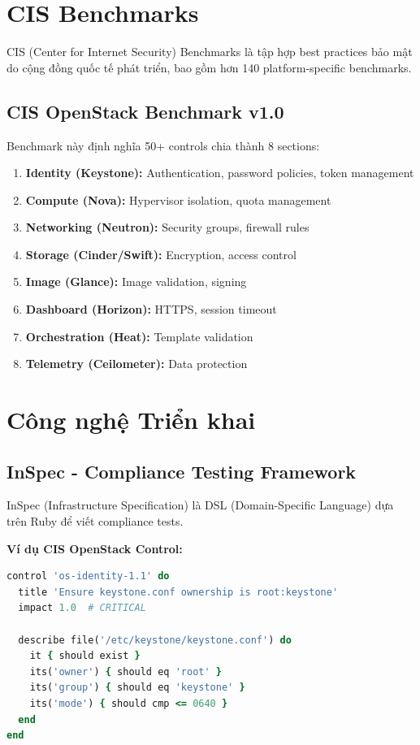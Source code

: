 \documentclass[12pt,a4paper]{report}
\begin{document}
\section{CIS Benchmarks}

CIS (Center for Internet Security) Benchmarks là tập hợp best practices bảo mật do cộng đồng quốc tế phát triển, bao gồm hơn 140 platform-specific benchmarks.

\subsection{CIS OpenStack Benchmark v1.0}

Benchmark này định nghĩa 50+ controls chia thành 8 sections:
\begin{enumerate}
    \item \textbf{Identity (Keystone):} Authentication, password policies, token management
    \item \textbf{Compute (Nova):} Hypervisor isolation, quota management
    \item \textbf{Networking (Neutron):} Security groups, firewall rules
    \item \textbf{Storage (Cinder/Swift):} Encryption, access control
    \item \textbf{Image (Glance):} Image validation, signing
    \item \textbf{Dashboard (Horizon):} HTTPS, session timeout
    \item \textbf{Orchestration (Heat):} Template validation
    \item \textbf{Telemetry (Ceilometer):} Data protection
\end{enumerate}

\section{Công nghệ Triển khai}

\subsection{InSpec - Compliance Testing Framework}

InSpec (Infrastructure Specification) là DSL (Domain-Specific Language) dựa trên Ruby để viết compliance tests. 

\textbf{Ví dụ CIS OpenStack Control:}
\begin{lstlisting}[language=Ruby, caption=InSpec Control kiểm tra Keystone configuration]
control 'os-identity-1.1' do
  title 'Ensure keystone.conf ownership is root:keystone'
  impact 1.0  # CRITICAL
  
  describe file('/etc/keystone/keystone.conf') do
    it { should exist }
    its('owner') { should eq 'root' }
    its('group') { should eq 'keystone' }
    its('mode') { should cmp <= 0640 }
  end
end
\end{lstlisting}
\end{document}
